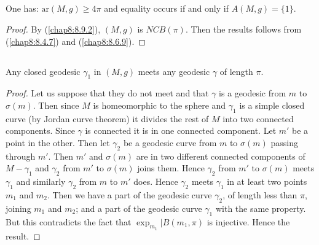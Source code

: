 \subsection{}\label{chap8:8.9.3}

\begin{coro*}
One has: $\text{ar}(M,g)\geq 4\pi$ and equality occurs if and only if
$A(M,g)=\{1\}$. 
\end{coro*}

\begin{proof}
By (\ref{chap8:8.9.2}), $(M,g)$ is $NCB(\pi)$. Then the results follows
from (\ref{chap8:8.4.7}) and (\ref{chap8:8.6.9}).
\end{proof}

\subsection{}\label{chap8:8.9.4}

\begin{lemma*}
Any closed geodesic $\gamma_{1}$ in $(M,g)$ meets any geodesic
$\gamma$ of length $\pi$.
\end{lemma*}

\begin{proof}
Let us suppose that they do not meet and that $\gamma$ is a geodesic
from $m$ to $\sigma(m)$. Then since $M$ is homeomorphic to the sphere
and $\gamma_{1}$ is a simple closed curve (by Jordan curve theorem) it
divides the rest of $M$ into two connected components. Since $\gamma$
is connected it is in one connected component. Let $m'$ be a point in
the other. Then let $\gamma_{2}$ be a geodesic curve from $m$ to
$\sigma(m)$ passing through $m'$. Then $m'$ and $\sigma(m)$ are in two
different connected components of $M-\gamma_{1}$ and $\gamma_{2}$ from
$m'$ to $\sigma(m)$ joins them. Hence $\gamma_{2}$ from $m'$ to
$\sigma(m)$ meets $\gamma_{1}$ and similarly $\gamma_{2}$ from $m$ to
$m'$ does. Hence $\gamma_{2}$ meets $\gamma_{1}$ in at least two
points $m_{1}$ and $m_{2}$. Then we have a part of the geodesic curve
$\gamma_{2}$, of length less than $\pi$, joining $m_{1}$ and $m_{2}$;
and a part of the geodesic curve $\gamma_{1}$ with the same
property. But this contradicts the fact that
$\exp_{m_{1}}|B(m_{1},\pi)$ is injective. Hence the result.
\end{proof}

\subsection{}\label{chap8:8.9.5}

